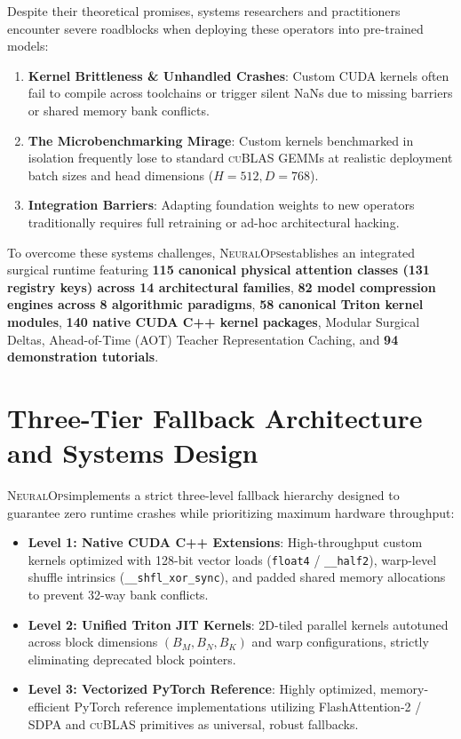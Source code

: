 \documentclass{article}
\newcommand{\systemname}{\textsc{NeuralOps}}
\begin{document}
Despite their theoretical promises, systems researchers and practitioners encounter severe roadblocks when deploying these operators into pre-trained models:
\begin{enumerate}
    \item \textbf{Kernel Brittleness \& Unhandled Crashes}: Custom CUDA kernels often fail to compile across toolchains or trigger silent NaNs due to missing barriers or shared memory bank conflicts.
    \item \textbf{The Microbenchmarking Mirage}: Custom kernels benchmarked in isolation frequently lose to standard \textsc{cuBLAS} GEMMs at realistic deployment batch sizes and head dimensions ($H=512, D=768$).
    \item \textbf{Integration Barriers}: Adapting foundation weights to new operators traditionally requires full retraining or ad-hoc architectural hacking.
\end{enumerate}

To overcome these systems challenges, \systemname establishes an integrated surgical runtime featuring \textbf{115 canonical physical attention classes (131 registry keys) across 14 architectural families}, \textbf{82 model compression engines across 8 algorithmic paradigms}, \textbf{58 canonical Triton kernel modules}, \textbf{140 native CUDA C++ kernel packages}, Modular Surgical Deltas, Ahead-of-Time (AOT) Teacher Representation Caching, and \textbf{94 demonstration tutorials}.

\section{Three-Tier Fallback Architecture and Systems Design}
\label{sec:system_design}

\systemname implements a strict three-level fallback hierarchy designed to guarantee zero runtime crashes while prioritizing maximum hardware throughput:
\begin{itemize}
    \item \textbf{Level 1: Native CUDA C++ Extensions}: High-throughput custom kernels optimized with 128-bit vector loads (\texttt{float4} / \texttt{\_\_half2}), warp-level shuffle intrinsics (\texttt{\_\_shfl\_xor\_sync}), and padded shared memory allocations to prevent 32-way bank conflicts.
    \item \textbf{Level 2: Unified Triton JIT Kernels}: 2D-tiled parallel kernels autotuned across block dimensions $(B_M, B_N, B_K)$ and warp configurations, strictly eliminating deprecated block pointers.
    \item \textbf{Level 3: Vectorized PyTorch Reference}: Highly optimized, memory-efficient PyTorch reference implementations utilizing FlashAttention-2 / SDPA and \textsc{cuBLAS} primitives as universal, robust fallbacks.
\end{itemize}
\end{document}
